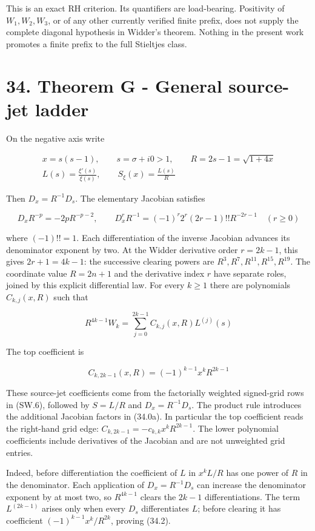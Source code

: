 \documentclass[
  11pt,
]{book}
\begin{document}
This is an exact RH criterion. Its quantifiers are load-bearing.
Positivity of \(W_1,W_2,W_3\), or of any other currently verified finite
prefix, does not supply the complete diagonal hypothesis in Widder's
theorem. Nothing in the present work promotes a finite prefix to the
full Stieltjes class.

\section{34. Theorem G - General source-jet
ladder}\label{theorem-g---general-source-jet-ladder}

On the negative axis write

\[
\begin{gathered}
x=s(s-1),\qquad s=\sigma+i0>1,\qquad R=2s-1=\sqrt{1+4x}\\
L(s)=\frac{\xi'(s)}{\xi(s)},\qquad S_\xi(x)=\frac{L(s)}R
\end{gathered}
\]

Then \(D_x=R^{-1}D_s\). The elementary Jacobian satisfies

\[
D_xR^{-p}=-2pR^{-p-2},\qquad
D_x^rR^{-1}=(-1)^r2^r(2r-1)!!R^{-2r-1}
\quad(r\ge0)
\tag{34.0a}
\]

where \((-1)!!=1\). Each differentiation of the inverse Jacobian
advances its denominator exponent by two. At the Widder derivative order
\(r=2k-1\), this gives \(2r+1=4k-1\): the successive clearing powers are
\(R^3,R^7,R^{11},R^{15},R^{19}\). The coordinate value \(R=2n+1\) and
the derivative index \(r\) have separate roles, joined by this explicit
differential law. For every \(k\ge1\) there are polynomials
\(C_{k,j}(x,R)\) such that

\[
\boxed{
R^{4k-1}W_k
=\sum_{j=0}^{2k-1}C_{k,j}(x,R)L^{(j)}(s)
}
\tag{34.1}
\]

The top coefficient is

\[
\boxed{
C_{k,2k-1}(x,R)
=(-1)^{k-1}x^kR^{2k-1}
}
\tag{34.2}
\]

These source-jet coefficients come from the factorially weighted
signed-grid rows in (SW.6), followed by \(S=L/R\) and \(D_x=R^{-1}D_s\).
The product rule introduces the additional Jacobian factors in (34.0a).
In particular the top coefficient reads the right-hand grid edge:
\(C_{k,2k-1}=-c_{k,k}x^kR^{2k-1}\). The lower polynomial coefficients
include derivatives of the Jacobian and are not unweighted grid entries.

Indeed, before differentiation the coefficient of \(L\) in \(x^kL/R\)
has one power of \(R\) in the denominator. Each application of
\(D_x=R^{-1}D_s\) can increase the denominator exponent by at most two,
so \(R^{4k-1}\) clears the \(2k-1\) differentiations. The term
\(L^{(2k-1)}\) arises only when every \(D_s\) differentiates \(L\);
before clearing it has coefficient \((-1)^{k-1}x^k/R^{2k}\), proving
(34.2).
\end{document}
